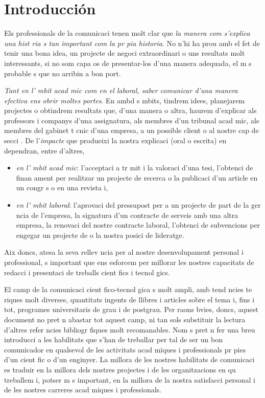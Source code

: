 

\chapter{Introducción}

Els professionals de la comunicaci  tenen molt clar que \emph{la manera com s'explica una hist ria  s tan important com la pr pia historia}. No n'hi ha prou amb el fet de tenir una bona idea, un projecte de negoci extraordinari o uns resultats molt interessants, si no som capa os de presentar-los d'una manera adequada, el m s probable  s que no arribin a bon port.

\emph{Tant en l' mbit acad mic com en el laboral, saber comunicar d'una manera efectiva ens obrir  moltes portes}. En ambd s  mbits, tindrem idees, planejarem projectes o obtindrem resultats que, d'una manera o altra, haurem d'explicar als professors i companys d'una assignatura, als membres d'un tribunal acad mic, als membres del gabinet t cnic d'una empresa, a un possible client o al nostre cap de secci . De l'\emph{impacte} que produeixi la nostra explicaci  (oral o escrita) en dependran, entre d'altres,
\begin{itemize}
 \item \emph{en l' mbit acad mic}: l'acceptaci  a tr mit i la valoraci  d'una tesi, l'obtenci  de finan ament per realitzar un projecte de recerca o la publicaci  d'un article en un congr s o en una revista i,
 \item \emph{en l' mbit laboral}: l'aprovaci  del pressupost per a un projecte de part de la ger ncia de l'empresa, la signatura d'un contracte de serveis amb una altra empresa, la renovaci  del nostre contracte laboral, l'obtenci  de subvencions per engegar un projecte de  o la nostra posici  de lideratge.
\end{itemize}
Aix  doncs, atesa la seva rellev ncia per al nostre desenvolupament personal i professional,  s important que ens esforcem per millorar les nostres capacitats de redacci  i presentaci  de treballs cient fics i tecnol gics.

El camp de la comunicaci  cient fico-tecnol gica  s molt ampli, amb tend ncies te riques molt diverses, quantitats ingents de llibres i articles sobre el tema i, fins i tot, programes universitaris de grau i de postgrau. Per raons  bvies, doncs, aquest document no pret n abastar tot aquest camp, ni tan sols substituir la lectura d'altres refer ncies bibliogr fiques molt recomanables. Nom s pret n fer una breu introducci  a les habilitats que s'han de treballar per tal de ser un bon comunicador en qualsevol de les activitats acad miques i professionals pr pies d'un cient fic o d'un enginyer. La millora de les nostres habilitats de comunicaci  es traduir  en la millora dels nostres projectes i de les organitzacions en qu  treballem i, potser m s important, en la millora de la nostra satisfacci  personal i de les nostres carreres acad miques i professionals.

